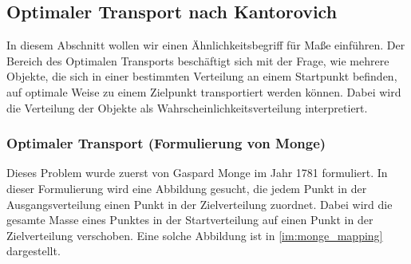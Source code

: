 \documentclass[twoside, 12pt,a4paper]{book}
\numberwithin{equation}{section}
\begin{document}
	
	
	
	
	
	
	
	
	
	
	
	
	
	
	
	
	
	
	
	\subsection{Optimaler Transport nach Kantorovich}
	In diesem Abschnitt wollen wir einen Ähnlichkeitsbegriff für Maße einführen. Der Bereich des Optimalen Transports beschäftigt sich mit der Frage, wie mehrere Objekte, die sich in einer bestimmten Verteilung an einem Startpunkt befinden, auf optimale Weise zu einem Zielpunkt transportiert werden können. Dabei wird die Verteilung der Objekte als Wahrscheinlichkeitsverteilung interpretiert. 
	
	
	\subsubsection{Optimaler Transport (Formulierung von Monge)}
	
	Dieses Problem wurde zuerst von Gaspard Monge im Jahr 1781 formuliert. In dieser Formulierung wird eine Abbildung gesucht, die jedem Punkt in der Ausgangsverteilung einen Punkt in der Zielverteilung zuordnet. Dabei wird die gesamte Masse eines Punktes in der Startverteilung auf einen Punkt in der Zielverteilung verschoben. Eine solche Abbildung ist in \autoref{im:monge_mapping} dargestellt.
	
\end{document}
